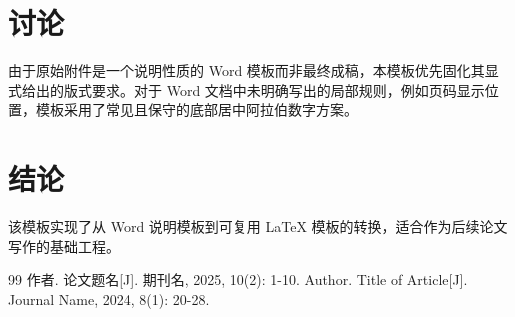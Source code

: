 \documentclass[science]{hnau-thesis}
\begin{document}
\section{讨论}
由于原始附件是一个说明性质的 Word 模板而非最终成稿，本模板优先固化其显式给出的版式要求。对于 Word 文档中未明确写出的局部规则，例如页码显示位置，模板采用了常见且保守的底部居中阿拉伯数字方案。

\section{结论}
该模板实现了从 Word 说明模板到可复用 LaTeX 模板的转换，适合作为后续论文写作的基础工程。

\begin{thebibliography}{99}
 作者. 论文题名[J]. 期刊名, 2025, 10(2): 1-10.
 Author. Title of Article[J]. Journal Name, 2024, 8(1): 20-28.
\end{thebibliography}


\end{document}
